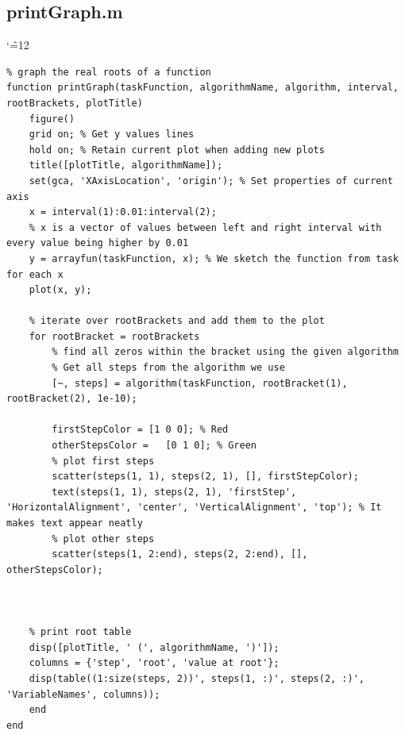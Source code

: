 \documentclass[12pt]{report}
\newenvironment{simplechar}{%
   \catcode`\^=12
}{}
\begin{document}
\subsection{printGraph.m}
\begin{simplechar}
\begin{lstlisting}
% graph the real roots of a function
function printGraph(taskFunction, algorithmName, algorithm, interval, rootBrackets, plotTitle)
    figure()
    grid on; % Get y values lines
    hold on; % Retain current plot when adding new plots
    title([plotTitle, algorithmName]);
    set(gca, 'XAxisLocation', 'origin'); % Set properties of current axis
    x = interval(1):0.01:interval(2);
    % x is a vector of values between left and right interval with every value being higher by 0.01
    y = arrayfun(taskFunction, x); % We sketch the function from task for each x
    plot(x, y);

    % iterate over rootBrackets and add them to the plot
    for rootBracket = rootBrackets
        % find all zeros within the bracket using the given algorithm
        % Get all steps from the algorithm we use
        [~, steps] = algorithm(taskFunction, rootBracket(1), rootBracket(2), 1e-10);

        firstStepColor = [1 0 0]; % Red
        otherStepsColor = 	[0 1 0]; % Green
        % plot first steps
        scatter(steps(1, 1), steps(2, 1), [], firstStepColor);
        text(steps(1, 1), steps(2, 1), 'firstStep', 'HorizontalAlignment', 'center', 'VerticalAlignment', 'top'); % It makes text appear neatly
        % plot other steps
        scatter(steps(1, 2:end), steps(2, 2:end), [], otherStepsColor);



    % print root table
    disp([plotTitle, ' (', algorithmName, ')']);
    columns = {'step', 'root', 'value at root'};
    disp(table((1:size(steps, 2))', steps(1, :)', steps(2, :)', 'VariableNames', columns));
    end
end

\end{lstlisting}
\end{simplechar}

\newpage
\end{document}
